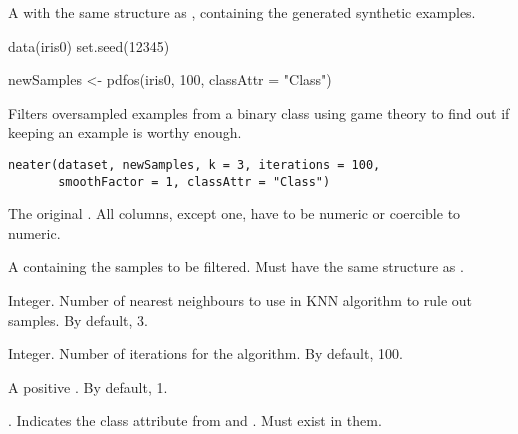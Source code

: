 %
\begin{Value}
A  with the same structure as ,
containing the generated synthetic examples.
\end{Value}
%
%
\begin{Examples}
\begin{ExampleCode}
data(iris0)
set.seed(12345)

newSamples <- pdfos(iris0, 100, classAttr = "Class")

\end{ExampleCode}
\end{Examples}
%
\begin{Description}\relax
Filters oversampled examples from a binary class  using game
theory to find out if keeping an example is worthy enough.
\end{Description}
%
\begin{Usage}
\begin{verbatim}
neater(dataset, newSamples, k = 3, iterations = 100, 
       smoothFactor = 1, classAttr = "Class")
\end{verbatim}
\end{Usage}
%
\begin{Arguments}
\begin{ldescription}
\item[\code{dataset}] The original . All columns, except
 one, have to be numeric or coercible to numeric.

\item[\code{newSamples}] A  containing the samples to be filtered.
Must have the same structure as .

\item[\code{k}] Integer. Number of nearest neighbours to use in KNN algorithm to
rule out samples. By default, 3.

\item[\code{iterations}] Integer. Number of iterations for the algorithm. By
default, 100.

\item[\code{smoothFactor}] A positive . By default, 1.

\item[\code{classAttr}] . Indicates the class attribute from
 and . Must exist in them.
\end{ldescription}
\end{Arguments}
